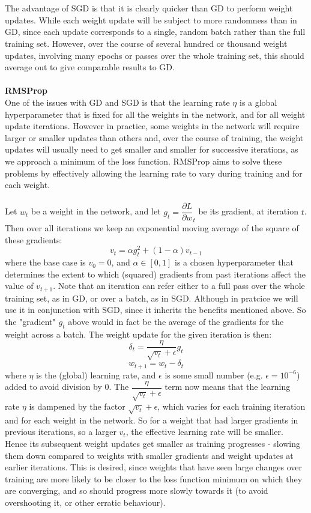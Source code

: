 \documentclass[11pt]{article} %
\theoremstyle{plain}
\theoremstyle{definition}
\begin{document}
\\
\\
\noindent
The advantage of SGD is that it is clearly quicker than GD to perform weight updates. While each weight update will be subject to more randomness than in GD, since each update corresponds to a single, random batch rather than the full training set. However, over the course of several hundred or thousand weight updates, involving many epochs or passes over the whole training set, this should average out to give comparable results to GD. 
\\
\\
\noindent
\textbf{RMSProp}
\\
\noindent
One of the issues with GD and SGD is that the learning rate \(\eta\) is a global hyperparameter that is fixed for all the weights in the network, and for all weight update iterations. However in practice, some weights in the network will require larger or smaller updates than others and, over the course of training, the weight updates will usually need to get smaller and smaller for successive iterations, as we approach a minimum of the loss function. RMSProp aims to solve these problems by effectively allowing the learning rate to vary during training and for each weight.
\\
\\
\noindent
Let \(w_t\) be a weight in the network, and let \(g_t = {\dfrac{\partial L}{\partial w}}_t\) be its gradient, at iteration \(t\). Then over all iterations we keep an exponential moving average of the square of these gradients:
\[ v_t = \alpha g_t^2 + (1-\alpha)v_{t-1} \]
where the base case is \(v_0 = 0\), and \( \alpha \in [0,1]\) is a chosen hyperparameter that determines the extent to which (squared) gradients from past iterations affect the value of \(v_{t+1}\). Note that an iteration can refer either to a full pass over the whole training set, as in GD, or over a batch, as in SGD. Although in pratcice we will use it in conjunction with SGD, since it inherits the benefits mentioned above. So the "gradient" \(g_t\) above would in fact be the average of the gradients for the weight across a batch. The weight update for the given iteration is then:
\[ \delta_t  = \dfrac{\eta}{\sqrt{v_t} + \epsilon} g_t \]
\[ w_{t+1} = w_t - \delta_t \]
where \(\eta\) is the (global) learning rate, and \(\epsilon\) is some small number (e.g. \(\epsilon=10^{-6}\)) added to avoid division by 0. The \(\dfrac{\eta}{\sqrt{v_t} + \epsilon}\) term now means that the learning rate \(\eta\) is dampened by the factor \(\sqrt{v_t} + \epsilon\), which varies for each training iteration and for each weight in the network. So for a weight that had larger gradients in previous iterations, so a larger \(v_t\), the effective learning rate will be smaller. Hence its subsequent weight updates get smaller as training progresses - slowing them down compared to weights with smaller gradients and weight updates at earlier iterations. This is desired, since weights that have seen large changes over training are more likely to be closer to the loss function minimum on which they are converging, and so should progress more slowly towards it (to avoid overshooting it, or other erratic behaviour).
\end{document}
